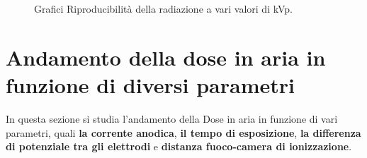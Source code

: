 \documentclass[a4paper]{article}
\begin{document}
\begin{figure}[H]%
    \centering
    \qquad
    \qquad
    \qquad
    
   \caption{Grafici Riproducibilità della radiazione a vari valori di kVp.}%
    \label{fig:1}%
\end{figure}

\newpage
\section{Andamento della dose in aria in funzione di diversi parametri}
In questa sezione si studia l'andamento della Dose in aria in funzione di vari parametri, quali \textbf{la corrente anodica}, \textbf{il tempo di esposizione}, \textbf{la differenza di potenziale tra gli elettrodi} e \textbf{distanza fuoco-camera di ionizzazione}.                           
\end{document}
